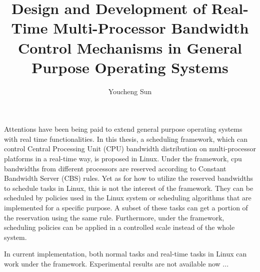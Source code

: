 \documentclass[a4paper, 12pt, openright, oneside, final]{book}%
\title{Design and Development of Real-Time Multi-Processor Bandwidth
  Control Mechanisms in General Purpose Operating Systems}
\author{Youcheng Sun}
\newcommand{\fncyblank}{\fancyhf{}}
\newenvironment{abstract}%
{\cleardoublepage\fncyblank\null\vfill\begin{center}%
\bfseries\abstractname\end{center}}%
{\vfill\null}
\begin{document}
\frontmatter

\maketitle

%

\begin{abstract}

  Attentions have been being paid to extend general purpose operating
  systems with real time functionalities. In this thesis, a scheduling
  framework, which can control Central Processing Unit (CPU) bandwidth
  distribution on multi-processor platforms in a real-time way, is
  proposed in Linux.  Under the framework, cpu bandwidths from
  different processors are reserved according to Constant Bandwidth
  Server (CBS) rules.  Yet as for how to utilize the reserved
  bandwidths to schedule tasks in Linux, this is not the interest of
  the framework. They can be scheduled by policies used in the Linux
  system or scheduling algorithms that are implemented for a specific
  purpose. A subset of these tasks can get a portion of the
  reservation using the same rule.  Furthermore, under the framework,
  scheduling policies can be applied in a controlled scale instead of
  the whole system.

  In current implementation, both normal tasks and real-time tasks in
  Linux can work under the framework. Experimental results are not
  available now ...
\end{abstract}

\tableofcontents

\mainmatter







\end{document}
